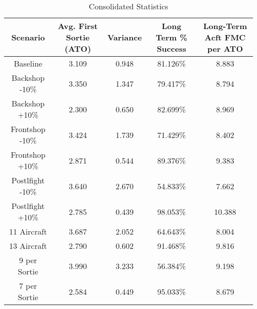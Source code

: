 \documentclass[12pt]{amsart}
\begin{document}
\newcommand\rowHeight{7pt}
\begin{landscape}
\begin{table}[H]
	\begin{tabular}{c|c|c|c|c}
		           Scenario             & Avg. First Sortie (ATO) & Variance & Long Term \% Success & Long-Term Acft FMC per ATO \\ \midrule
		           Baseline             &          3.109          &  0.948   &       81.126\%       &           8.883            \\
		[\rowHeight]
		 Backshop -10\%  &          3.350          &  1.347   &       79.417\%       &           8.794            \\
		[\rowHeight]
		 Backshop +10\%  &          2.300          &  0.650   &       82.699\%       &           8.969            \\
		[\rowHeight]
		Frontshop -10\%  &          3.424          &  1.739   &       71.429\%       &           8.402            \\
		[\rowHeight]
		Frontshop +10\%  &          2.871          &  0.544   &       89.376\%       &           9.383            \\
		[\rowHeight]
		Postlfight -10\% &          3.640          &  2.670   &       54.833\%       &           7.662            \\
		[\rowHeight]
		Postlfight +10\% &          2.785          &  0.439   &       98.053\%       &           10.388           \\
		 [\rowHeight]
		  11 Aircraft   &          3.687          &  2.052   &       64.643\%       &           8.004            \\
		 [\rowHeight]
		  13 Aircraft   &          2.790          &  0.602   &       91.468\%       &           9.816            \\
		 [\rowHeight]
		  9 per Sortie  &          3.990          &  3.233   &       56.384\%       &           9.198            \\
		 [\rowHeight]
		  7 per Sortie  &          2.584          &  0.449   &       95.033\%       &           8.679
	\end{tabular}
	\caption{Consolidated Statistics}
	\label{statsTable}
\end{table}
\end{landscape}
\end{document}
